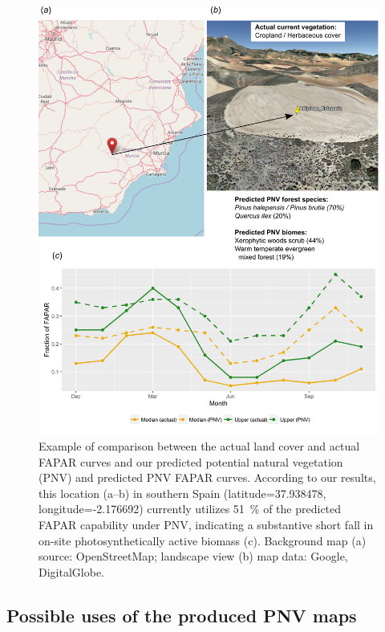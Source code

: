 \documentclass[fleqn,10pt,lineno]{wlpeerj} %
\begin{document}
\begin{figure}[!hbt]
\centering
\includegraphics[width=\linewidth]{Fig_15.png}
\caption{Example of comparison between the actual land cover and actual FAPAR curves and our predicted potential natural vegetation (PNV) and predicted PNV FAPAR curves. According to our results, this location (a--b) in southern Spain (latitude=37.938478, longitude=-2.176692) currently utilizes \SI{51}{\percent} of the predicted FAPAR capability under PNV, indicating a substantive short fall in on-site photosynthetically active biomass (c). Background map (a) source: OpenStreetMap; landscape view (b) map data: Google, DigitalGlobe.}
\label{Fig_example_Altiplano_Estepario_assessment}
\end{figure}

\subsection*{Possible uses of the produced PNV maps}
\end{document}
